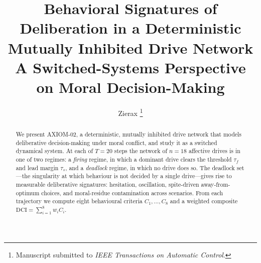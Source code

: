 \documentclass[journal]{IEEEtran}
\newcommand{\DCI}{\mathrm{DCI}}
\begin{document}
\title{Behavioral Signatures of Deliberation in a Deterministic Mutually
Inhibited Drive Network\\ A Switched-Systems Perspective on Moral
Decision-Making}

\author{Zierax%
\thanks{Manuscript submitted to \emph{IEEE Transactions on Automatic Control}.}}


\maketitle

\begin{abstract}
We present AXIOM-02, a deterministic, mutually inhibited drive network that
models deliberative decision-making under moral conflict, and study it as
a switched dynamical system. At each of $T=20$ steps the network of
$n=18$ affective drives is in one of two regimes: a \emph{firing} regime,
in which a dominant drive clears the threshold $\tau_f$ and lead margin
$\tau_s$, and a \emph{deadlock} regime, in which no drive does so. The
deadlock set---the singularity at which behaviour is not decided by a
single drive---gives rise to measurable deliberative signatures:
hesitation, oscillation, spite-driven away-from-optimum choices, and
moral-residue contamination across scenarios. From each trajectory we
compute eight behavioural criteria $C_1,\ldots,C_8$ and a weighted
composite $\DCI=\sum_{i=1}^{8} w_i C_i$.


\end{abstract}
\end{document}
